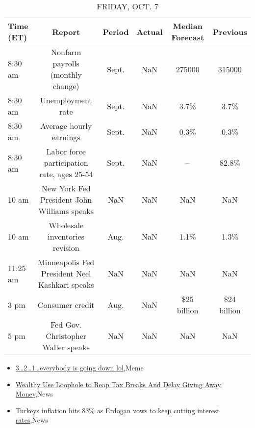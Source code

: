 \documentclass{article}%
\begin{document}
%


\begin{table}[htbp]%
\caption{FRIDAY, OCT. 7}%
\centering%
\begin{adjustbox}{width=1\textwidth}%
\begin{tabular}{lccccc}
\toprule
Time (ET) &                                         Report & Period & Actual & Median Forecast &    Previous \\
\midrule
  8:30 am &              Nonfarm payrolls (monthly change) &  Sept. &    NaN &          275000 &      315000 \\
  8:30 am &                              Unemployment rate &  Sept. &    NaN &            3.7\% &        3.7\% \\
  8:30 am &                        Average hourly earnings &  Sept. &    NaN &            0.3\% &        0.3\% \\
  8:30 am &     Labor force participation rate, ages 25-54 &  Sept. &    NaN &              -- &       82.8\% \\
    10 am &    New York Fed President John Williams speaks &    NaN &    NaN &             NaN &         NaN \\
    10 am &                 Wholesale inventories revision &   Aug. &    NaN &            1.1\% &        1.3\% \\
 11:25 am & Minneapolis Fed President Neel Kashkari speaks &    NaN &    NaN &             NaN &         NaN \\
     3 pm &                                Consumer credit &   Aug. &    NaN &     \$25 billion & \$24 billion \\
     5 pm &             Fed Gov. Christopher Waller speaks &    NaN &    NaN &             NaN &         NaN \\
\bottomrule
\end{tabular}
%
\end{adjustbox}%
\end{table}

%
\begin{itemize}%
\item%
\href{https://reddit.com/r/StockMarket/comments/xudmjt/321\_everybody\_is\_going\_down\_lol/}{3\ldots2\ldots1\ldots everybody is going down lol},Meme%
\item%
\href{https://reddit.com/r/Economics/comments/xugvyk/wealthy\_use\_loophole\_to\_reap\_tax\_breaks\_and\_delay/}{Wealthy Use Loophole to Reap Tax Breaks  And Delay Giving Away Money},News%
\item%
\href{https://reddit.com/r/Economics/comments/xufmx7/turkeys\_inflation\_hits\_83\_as\_erdogan\_vows\_to\_keep/}{Turkeys inflation hits 83\% as Erdogan vows to keep cutting interest rates},News%
\end{itemize}%
\end{document}
